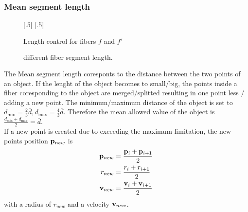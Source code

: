 \subsubsection{Mean segment length}
% 
\begin{figure}[!t]
    \def\tikzwidth{.42\textwidth}
    [.5\textwidth]{
    }
    [.5\textwidth]{
    }
	\caption{Length control for fibers $f$ and $f'$}
	\label{fig:merge_split}
\end{figure}
% 
% 
\begin{figure}[!t]
    \centering
    \def\tikzwidth{\textwidth}
	\caption{different fiber segment length.}
	\label{fig:model_length}
\end{figure}
% 
The Mean segment length coresponts to the distance between the two points of an object.
If the lenght of the object becomes to small/big, the points inside a fiber coresponding to the object are merged/splitted resulting in one point less / adding a new point.
The minimum/maximum distance of the object is set to $d_{\min} = \frac{2}{3} \overline{d}, d_{\max} = \frac{4}{3}\overline{d}$.
Therefore the mean allowed value of the object is $\frac{d_{\min} + d_{\max}}{2} = \overline{d}$. \\
% 
If a new point is created due to exceeding the maximum limitation, the new points position $\mathbf{p}_{new}$ is 
\begin{align}
\begin{split}
\mathbf{p}_{new} &= \frac{\mathbf{p}_{i} + \mathbf{p}_{i+1}}{2}\\
r_{new} &= \frac{r_{i} + r_{i+1}}{2}\\
\mathbf{v}_{new} &= \frac{\mathbf{v}_{i} + \mathbf{v}_{i+1}}{2}
\end{split}
\end{align}
with a radius of $r_{new}$ and a velocity $\mathbf{v}_{new}$.
% 
